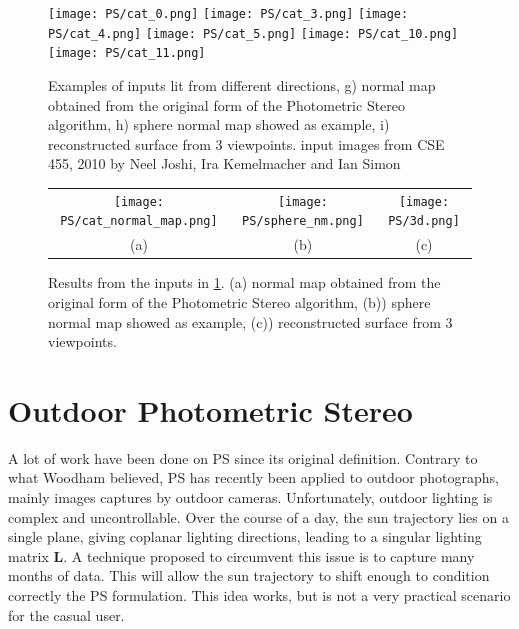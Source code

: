 
\begin{figure}
\centering
\texttt{[image: PS/cat\_0.png]}
\texttt{[image: PS/cat\_3.png]}
\texttt{[image: PS/cat\_4.png]}
\texttt{[image: PS/cat\_5.png]}
\texttt{[image: PS/cat\_10.png]}
\texttt{[image: PS/cat\_11.png]}
\caption{Examples of inputs lit from different directions, g) normal map obtained from the original form of the Photometric Stereo algorithm, h) sphere normal map showed as example, i) reconstructed surface from 3 viewpoints.\newline
{\small input images from CSE 455, 2010 by Neel Joshi, Ira Kemelmacher and Ian Simon}
}
\label{fig:PS_example}
\end{figure}

\begin{figure}
\begin{tabular}{ccc}
\texttt{[image: PS/cat\_normal\_map.png]} &
\texttt{[image: PS/sphere\_nm.png]} &
\texttt{[image: PS/3d.png]} \\
(a) & (b) & (c)
\end{tabular}
\caption{Results from the inputs in \ref{fig:PS_example}. (a) normal map obtained from the original form of the Photometric Stereo algorithm, (b)) sphere normal map showed as example, (c)) reconstructed surface from 3 viewpoints.}
\label{fig:PS_example_res}
\end{figure}

\section{Outdoor Photometric Stereo}

A lot of work have been done on PS since its original definition. Contrary to what Woodham believed, PS has recently been applied to outdoor photographs, mainly images captures by outdoor cameras. Unfortunately, outdoor lighting is complex and uncontrollable. Over the course of a day, the sun trajectory lies on a single plane, giving coplanar lighting directions, leading to a singular lighting matrix $\mathbf{L}$. A technique proposed to circumvent this issue is to capture many months of data. This will allow the sun trajectory to shift enough to condition correctly the PS formulation. This idea works, but is not a very practical scenario for the casual user.

